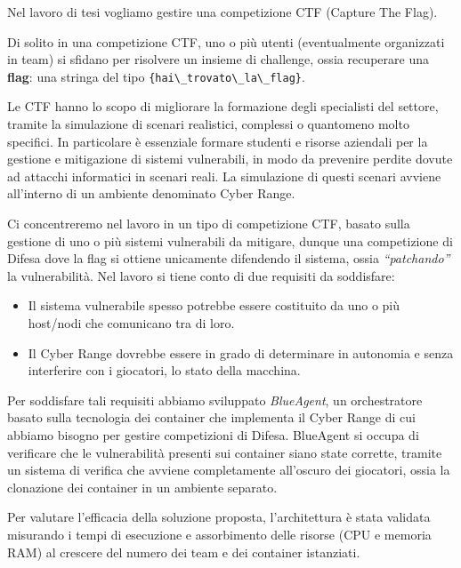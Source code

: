 Nel lavoro di tesi vogliamo gestire una competizione CTF (Capture The
Flag).

Di solito in una competizione CTF, uno o più utenti (eventualmente
organizzati in team) si sfidano per risolvere un insieme di challenge,
ossia recuperare una \textbf{flag}: una stringa del tipo
\passthrough{\lstinline!\{hai\_trovato\_la\_flag\}!}.

Le CTF hanno lo scopo di migliorare la formazione degli specialisti del
settore, tramite la simulazione di scenari realistici, complessi o
quantomeno molto specifici. In particolare è essenziale formare studenti
e risorse aziendali per la gestione e mitigazione di sistemi
vulnerabili, in modo da prevenire perdite dovute ad attacchi informatici
in scenari reali. La simulazione di questi scenari avviene all'interno
di un ambiente denominato Cyber Range.

Ci concentreremo nel lavoro in un tipo di competizione CTF, basato sulla
gestione di uno o più sistemi vulnerabili da mitigare, dunque una
competizione di Difesa dove la flag si ottiene unicamente difendendo il
sistema, ossia \emph{``patchando''} la vulnerabilità. Nel lavoro si
tiene conto di due requisiti da soddisfare:

\begin{itemize}
\tightlist
\item
  Il sistema vulnerabile spesso potrebbe essere costituito da uno o più
  host/nodi che comunicano tra di loro.
\item
  Il Cyber Range dovrebbe essere in grado di determinare in autonomia e
  senza interferire con i giocatori, lo stato della macchina.
\end{itemize}

Per soddisfare tali requisiti abbiamo sviluppato \emph{BlueAgent}, un
orchestratore basato sulla tecnologia dei container che implementa il
Cyber Range di cui abbiamo bisogno per gestire competizioni di Difesa.
BlueAgent si occupa di verificare che le vulnerabilità presenti sui
container siano state corrette, tramite un sistema di verifica che
avviene completamente all'oscuro dei giocatori, ossia la clonazione dei
container in un ambiente separato.

Per valutare l'efficacia della soluzione proposta, l'architettura è
stata validata misurando i tempi di esecuzione e assorbimento delle
risorse (CPU e memoria RAM) al crescere del numero dei team e dei
container istanziati.
